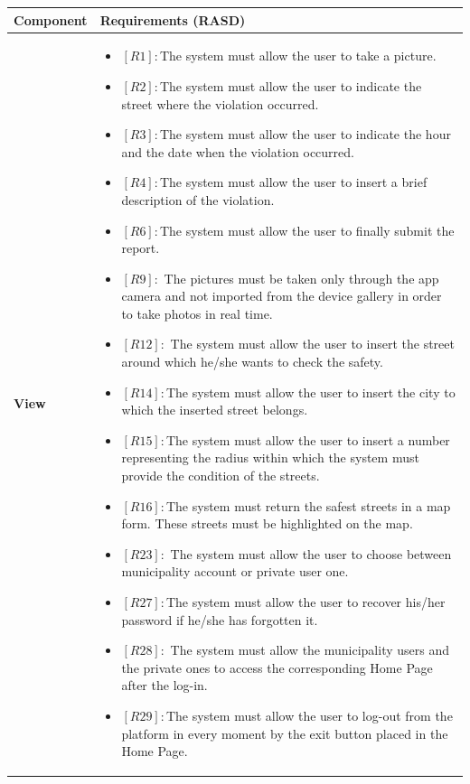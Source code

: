\documentclass[titlepage]{article}
\begin{document}
\begin{longtable}{| p{4 cm} | p{11.5 cm} |} \hline
		Component  & Requirements (RASD) 
		 \\ \hline
		\newline \textbf {View} &
		\begin{itemize}
		\item \textbf{$[R1]:$}The system must allow the user to take a picture. 
		\item \textbf{$[R2]:$}The system must allow the user to indicate the street where the violation occurred. 
		\item \textbf{$[R3]:$}The system must allow the user to indicate the hour and the date when the violation occurred. 
		\item \textbf{$[R4]:$}The system must allow the user to insert a brief description of the violation. 
		 \item \textbf{$[R6]:$}The system must allow the user to finally submit the report. 
		 \item \textbf{$[R9]:$} The pictures must be taken only through the app camera and not imported from the device gallery in order to take photos in real time. 
		 \item \textbf{$[R12]:$} The system must allow the user to insert the street around which he/she wants to check the safety.
		 \item \textbf{$[R14]:$}The system must allow the user to insert the city to which the inserted street belongs. 
		 \item \textbf{$[R15]:$}The system must allow the user to insert a number representing the radius within which the system must provide the condition of the streets.
		 \item \textbf{$[R16]:$}The system must return the safest streets in a map form. These streets must be highlighted on the map.
		 \item \textbf{$[R23]:$} The system must allow the user to choose between municipality account or private user one. 
		 \item \textbf{$[R27]:$}The system must allow the user to recover his/her password if he/she has forgotten it.
		 \item \textbf{$[R28]:$} The system must allow the municipality users and the private ones to access the corresponding Home Page after the log-in. 
		 \item \textbf{$[R29]:$}The system must allow the user to log-out from the platform in every moment by the exit button placed in the Home Page. 
	\end{itemize} \\ \hline

\end{longtable}
\end{document}
